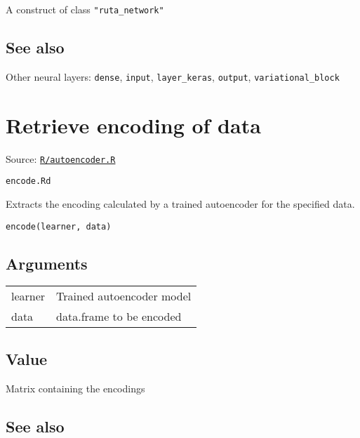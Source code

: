 A construct of class \texttt{"ruta\_network"}

\hypertarget{see-also}{\subsection{\texorpdfstring{\protect\hyperlink{see-also}{}See
also}{See also}}\label{see-also}}

Other neural layers: \texttt{dense}, \texttt{input},
\texttt{layer\_keras}, \texttt{output}, \texttt{variational\_block}

\section{Retrieve encoding of data}\label{retrieve-encoding-of-data}

Source:
\href{https://github.com/fdavidcl/ruta/blob/master/R/autoencoder.R}{\texttt{R/autoencoder.R}}

\texttt{encode.Rd}

Extracts the encoding calculated by a trained autoencoder for the
specified data.

\begin{verbatim}
encode(learner, data)
\end{verbatim}

\hypertarget{arguments}{\subsection{\texorpdfstring{\protect\hyperlink{arguments}{}Arguments}{Arguments}}\label{arguments}}

\begin{longtable}[c]{@{}ll@{}}
\toprule
learner & Trained autoencoder model\tabularnewline
data & data.frame to be encoded\tabularnewline
\bottomrule
\end{longtable}

\hypertarget{value}{\subsection{\texorpdfstring{\protect\hyperlink{value}{}Value}{Value}}\label{value}}

Matrix containing the encodings

\hypertarget{see-also}{\subsection{\texorpdfstring{\protect\hyperlink{see-also}{}See
also}{See also}}\label{see-also}}

